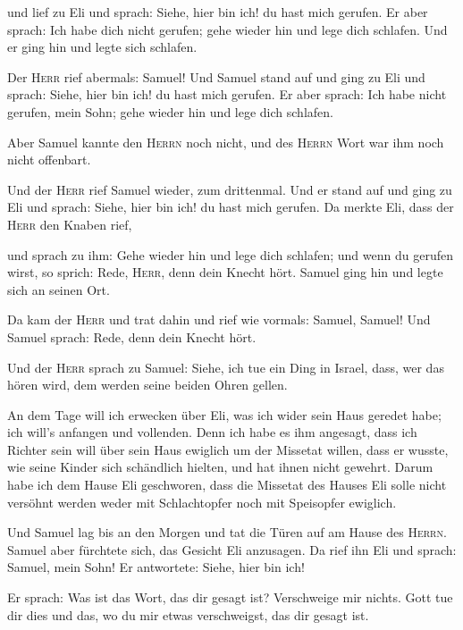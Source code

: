  und lief zu Eli und sprach: Siehe, hier bin ich! du hast
mich gerufen. Er aber sprach: Ich habe dich nicht gerufen; gehe wieder
hin und lege dich schlafen. Und er ging hin und legte sich schlafen.

 Der \textsc{Herr} rief abermals: Samuel! Und Samuel stand
auf und ging zu Eli und sprach: Siehe, hier bin ich! du hast mich
gerufen. Er aber sprach: Ich habe nicht gerufen, mein Sohn; gehe wieder
hin und lege dich schlafen.

 Aber Samuel kannte den \textsc{Herrn} noch nicht, und des
\textsc{Herrn} Wort war ihm noch nicht offenbart.

 Und der \textsc{Herr} rief Samuel wieder, zum drittenmal.
Und er stand auf und ging zu Eli und sprach: Siehe, hier bin ich! du
hast mich gerufen. Da merkte Eli, dass der \textsc{Herr} den Knaben
rief,

 und sprach zu ihm: Gehe wieder hin und lege dich
schlafen; und wenn du gerufen wirst, so sprich: Rede, \textsc{Herr},
denn dein Knecht hört. Samuel ging hin und legte sich an seinen Ort.

 Da kam der \textsc{Herr} und trat dahin und rief wie
vormals: Samuel, Samuel! Und Samuel sprach: Rede, denn dein Knecht hört.

 Und der \textsc{Herr} sprach zu Samuel: Siehe, ich tue
ein Ding in Israel, dass, wer das hören wird, dem werden seine beiden
Ohren gellen.

 An dem Tage will ich erwecken über Eli, was ich wider
sein Haus geredet habe; ich will's anfangen und vollenden.
 Denn ich habe es ihm angesagt, dass ich Richter sein
will über sein Haus ewiglich um der Missetat willen, dass er wusste, wie
seine Kinder sich schändlich hielten, und hat ihnen nicht gewehrt.
 Darum habe ich dem Hause Eli geschworen, dass die
Missetat des Hauses Eli solle nicht versöhnt werden weder mit
Schlachtopfer noch mit Speisopfer ewiglich.

 Und Samuel lag bis an den Morgen und tat die Türen auf
am Hause des \textsc{Herrn}. Samuel aber fürchtete sich, das Gesicht Eli
anzusagen.  Da rief ihn Eli und sprach: Samuel, mein
Sohn! Er antwortete: Siehe, hier bin ich!

 Er sprach: Was ist das Wort, das dir gesagt ist?
Verschweige mir nichts. Gott tue dir dies und das, wo du mir etwas
verschweigst, das dir gesagt ist.


